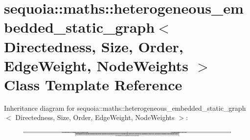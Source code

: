 \hypertarget{classsequoia_1_1maths_1_1heterogeneous__embedded__static__graph}{}\section{sequoia\+::maths\+::heterogeneous\+\_\+embedded\+\_\+static\+\_\+graph$<$ Directedness, Size, Order, Edge\+Weight, Node\+Weights $>$ Class Template Reference}
\label{classsequoia_1_1maths_1_1heterogeneous__embedded__static__graph}
Inheritance diagram for sequoia\+::maths\+::heterogeneous\+\_\+embedded\+\_\+static\+\_\+graph$<$ Directedness, Size, Order, Edge\+Weight, Node\+Weights $>$\+:\begin{figure}[H]
\begin{center}
\leavevmode
\includegraphics[height=0.300107cm]{classsequoia_1_1maths_1_1heterogeneous__embedded__static__graph}
\end{center}
\end{figure}
